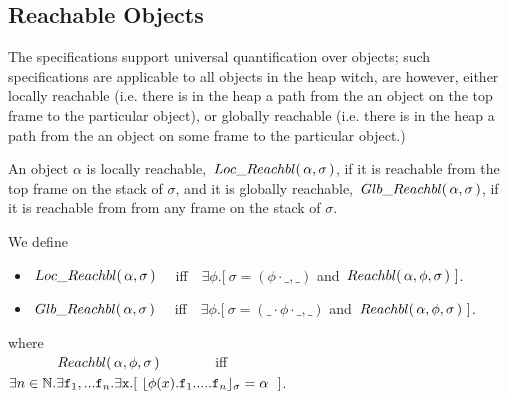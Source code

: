   \subsection{{Reachable  Objects}}


{The  \SpecLang  specifications support universal quantification over  objects; such specifications 
are applicable  to all objects in the heap witch, are however, either locally reachable (i.e. there is in the heap a path from the an 
object on the top frame to the particular object), or globally reachable (i.e. there is in the heap a path from the an 
object on some frame to the particular object.)

An object $\alpha$ is  locally reachable, $ \,Loc\_Reachbl(\,\alpha,\sigma\,) $, if it is reachable from the top frame on the stack of $\sigma$,
and it is globally reachable, $\,Glb\_Reachbl(\,\alpha,\sigma\,)$, if it is reachable from from any  frame on the stack of $\sigma$.
 
\begin{definition} We define 
\begin{itemize}
\item
$ \,Loc\_Reachbl(\,\alpha,\sigma\,) $ \ \ iff\ \  
$\exists \phi.[\ \sigma=(\phi\cdot\_, \_)$ and $\Relevant \alpha \phi \sigma\ ]$. %
\item
$\,Glb\_Reachbl(\,\alpha,\sigma\,)$  \ \ iff\ \  
$\exists \phi.[\ \sigma=(\_\cdot\phi\cdot\_, \_)$ and $\Relevant \alpha \phi \sigma\ ]$. %
\end{itemize}
where\\
$\strut\ \ \ \  \ \ \ \ \ \ \,Reachbl(\,\alpha,\phi,\sigma\,) $  \ \ \ \ \ \ \ iff\ \  
$\exists n\in \mathbb{N}.\exists \prg{f}_1,... \prg{f}_n.\exists \prg{x}.[ \ \interpret{\sigma}{\phi(x).\prg{f}_1.....\prg{f}_n} = \alpha \ \ ]$.

\end{definition}

}

